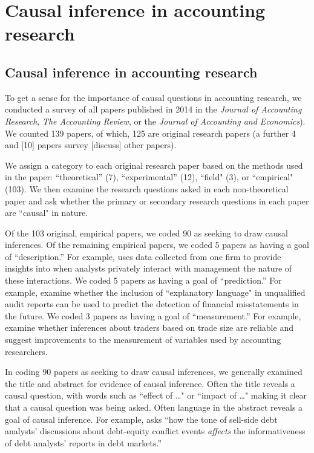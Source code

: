 \documentclass[11pt]{amsart}
\begin{document}
\section{Causal inference in accounting research}

\subsection{Causal inference in accounting research}
To get a sense for the importance of causal questions in accounting research,
we conducted a survey of all papers published in 2014 in the  \textit{Journal of Accounting Research}, \textit{The Accounting Review}, or the \textit{Journal of Accounting and Economics}).
We counted 139 papers, of which, 
125 are original research papers 
(a further 4 and
[10] papers survey [discuss] other
papers).

We assign a category to each original research paper based on the methods used in the paper: ``theoretical''  (7), ``experimental'' (12), ``field" (3), or ``empirical"  (103).
We then examine the research questions asked in each non-theoretical paper and
ask whether the primary or secondary research questions in each paper are
``causal" in nature.

Of the  103 original, empirical papers, we coded 90 as seeking to draw causal inferences. Of the remaining empirical papers, we coded 5 papers as having a goal of ``description.'' 
For example, \citet{Soltes:2013ba} uses data collected from one firm to provide insights into when analysts privately interact with management the nature of these interactions.
We coded 5 papers as having a goal of ``prediction.'' 
For example, \citet{Czerney:2014bv} examine whether the inclusion of ``explanatory language" in unqualified audit reports can be used to predict the detection of financial misstatements in the future.
We coded 3 papers as having a goal of ``measurement.'' 
For example, \citet{Cready:2014ji} examine whether inferences about traders based on trade size are reliable and suggest improvements to the measurement of variables used by accounting researchers. 

In coding 90 papers as seeking to draw causal inferences, we generally examined the title and
abstract for evidence of causal inference. Often the title reveals a causal question, with words such as  ``effect of \dots" or ``impact of \dots"  
\citep[e.g.][]{Cohen:2014jl,Clorproell:2014cv} making it clear that a causal question was being asked. 
Often language in the abstract reveals a goal of causal inference. For example, \citet{deFranco:2014ct} asks ``how the tone of sell-side debt analysts’ discussions about debt-equity conflict events \emph{affects} the informativeness of debt analysts’ reports in debt markets.''
\end{document}
